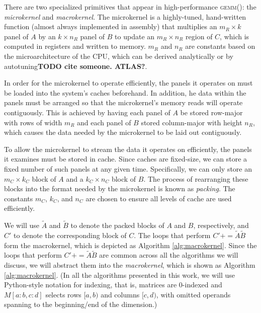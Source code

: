\documentclass[12pt]{article}
\newcommand*{\TO}{\textbf{to}}
\newcommand*{\pluseq}{\mathrel{{+}{=}}}
\newcommand*{\gemm}{{\textsc{gemm()}}}
\begin{document}
There are two specialized primitives that appear in high-performance \gemm{}: the \emph{microkernel} and \emph{macrokernel}.
The microkernel is a highly-tuned, hand-written function (almost always implemented in assembly) that multiplies an $m_R \times k$ panel of $A$ by an $k \times n_R$ panel of $B$ to update an $m_R \times n_R$ region of $C$, which is computed in registers and written to memory.
$m_R$ and $n_R$ are constants based on the microarchitecture of the CPU, which can be derived analytically\cite{Low2016} or by autotuning\textbf{TODO cite someone. ATLAS?}.

In order for the microkernel to operate efficiently, the panels it operates on must be loaded into the system's caches beforehand.
In addition, he data within the panels must be arranged so that the microkernel's memory reads will operate contiguously.
This is achieved by having each panel of $A$ be stored row-major with rows of width $m_R$ and each panel of $B$ stored column-major with height $n_R$, which causes the data needed by the microkernel to be laid out contiguously.

To allow the microkernel to stream the data it operates on efficiently, the panels it examines must be stored in cache.
Since caches are fixed-size, we can store a fixed number of such panels at any given time.
Specifically, we can only store an $m_C \times k_C$ block of $A$ and a $k_C \times n_C$ block of $B$.
The process of rearranging these blocks into the format needed by the microkernel is known as \emph{packing}.
The constants $m_C$, $k_C$, and $n_C$ are chosen to ensure all levels of cache are used efficiently.

We will use $\tilde{A}$ and $\tilde{B}$ to denote the packed blocks of $A$ and $B$, respectively, and $C'$ to denote the corresponding block of $C$.
The loops that perform $C' \pluseq \tilde{A}\tilde{B}$ form the macrokernel, which is depicted as Algorithm \ref{alg:macrokernel}.
Since the loops that perform $C' \pluseq \tilde{A}\tilde{B}$ are common across all the algorithms we will discuss, we will abstract them into the \emph{macrokernel}, which is shown as Algorithm \ref{alg:macrokernel}.
(In all the algorithms presented in this work, we will use Python-style notation for indexing, that is, matrices are 0-indexed and   $M[a:b, c:d]$ selects rows $[a, b)$ and columns $[c, d)$, with omitted operands spanning to the beginning/end of the dimension.)

\begin{algorithm}
  \caption{The macrokernel of a high-performance \gemm{} implementation}
  \label{alg:macrokernel}
  \begin{tikzpicture}
    
  \end{tikzpicture}
  \begin{algorithmic}
    \For{$j \gets 0, n_R, \ldots$ \TO{} $n_C$}
    \For{$i \gets 0, m_R, \ldots$ \TO{} $m_C$}
    \State{$C'[i:i + m_R, j:j + n_R] \pluseq \tilde{A}[i:i+m_R,:] \cdot \tilde{B}[:,j:j+n_R]$}
    \EndFor{}
    \EndFor{}
    \EndProcedure{}
  \end{algorithmic}
\end{algorithm}
\end{document}
